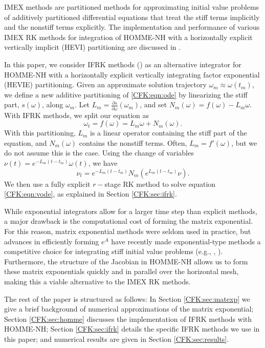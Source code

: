 \documentclass{csri19}
\begin{document}
IMEX methods are partitioned methods for approximating initial value 
problems of additively partitioned differential equations that treat the 
stiff terms implicitly and the nonstiff terms explicitly. The 
implementation and performance of various IMEX RK methods for integration 
of HOMME-NH with a horizontally explicit vertically implicit (HEVI) 
partitioning are discussed in \cite{CFK:Steyer2019}.

In this paper, we consider IFRK methods (\cite{CFK:Minchev2006}) as 
an alternative integrator for HOMME-NH with a horizontally explicit 
vertically integrating factor exponential (HEVIE) partitioning. Given an 
approximate solution trajectory $\omega_m \approx \omega(t_m)$, we define a 
new additive partitioning of \ref{CFK:eqn:ode} by linearizing the stiff 
part, $s(\omega)$, along $\omega_m$. Let $L_m=\frac{\partial s}{\partial
{\omega}}(\omega_m)$, and set $N_m(\omega) = f(\omega) - L_m \omega$. With 
IFRK methods, we split our equation as \[ \omega_t = f(\omega) = 
L_m\omega +  N_m(\omega).\] With this partitioning, $L_m$ is a  linear 
operator containing the stiff part of the equation, and $N_m(\omega)$ 
contains the nonstiff terms. Often, $L_m = f'(\omega)$, but we do not 
assume this is the case. Using the change of variables $\nu(t)=e^{-L_m
(t-t_m)}\omega(t)$, we have \begin{equation}
\label{CFK:eqn:vode}
\nu_t = e^{-L_m(t-t_m)}N_m(e^{L_m(t-t_m)}\nu). \end{equation} 
We then use a fully explicit $r-$stage RK method to solve equation 
\ref{CFK:eqn:vode}, as explained in Section \ref{CFK:sec:ifrk}.

While exponential integrators allow for a larger time step than explicit 
methods, a major drawback is the computational cost of forming the matrix 
exponential. For this reason, matrix exponential methods were seldom used 
in practice, but advances in efficiently forming $e^A$ have recently made 
exponential-type methods a competitive choice for integrating stiff initial 
value problems (e.g., \cite{CFK:Clancy2013}, \cite{CFK:Garcia2014}). 
Furthermore, the structure of the Jacobian in HOMME-NH allows us to form 
these matrix exponentials quickly and in parallel over the horizontal mesh, 
making this a viable alternative to the IMEX RK methods.

The rest of the paper is structured as follows: In Section 
\ref{CFK:sec:matexp} we give a brief background of numerical approximations 
of the matrix exponential; Section \ref{CFK:sec:homme} discusses the 
implementation of IFRK methods with HOMME-NH; Section \ref{CFK:sec:ifrk} 
details the specific IFRK methods we use in this paper; and numerical 
results are given in Section \ref{CFK:sec:results}.
\end{document}
